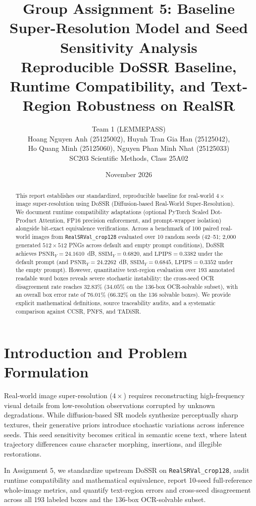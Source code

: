 \documentclass[11pt]{article}
\title{Group Assignment 5: Baseline Super-Resolution Model and Seed Sensitivity Analysis\\
\large Reproducible DoSSR Baseline, Runtime Compatibility, and Text-Region Robustness on RealSR}
\author{Team 1 (LEMMEPASS)\\
Hoang Nguyen Anh (25125002), Huynh Tran Gia Han (25125042),\\
Ho Quang Minh (25125060), Nguyen Phan Minh Nhat (25125033)\\
SC203 Scientific Methods, Class 25A02}
\date{November 2026}
\begin{document}
\maketitle

\begin{abstract}
This report establishes our standardized, reproducible baseline for real-world $4\times$ image super-resolution using DoSSR (Diffusion-based Real-World Super-Resolution). We document runtime compatibility adaptations (optional PyTorch Scaled Dot-Product Attention, FP16 precision enforcement, and prompt-wrapper isolation) alongside bit-exact equivalence verifications. Across a benchmark of 100 paired real-world images from \texttt{RealSRVal\_crop128} evaluated over 10 random seeds (42--51; 2,000 generated $512\times 512$ PNGs across default and empty prompt conditions), DoSSR achieves $\text{PSNR}_Y = 24.1610$~dB, $\text{SSIM}_Y = 0.6820$, and $\text{LPIPS} = 0.3382$ under the default prompt (and $\text{PSNR}_Y = 24.2262$~dB, $\text{SSIM}_Y = 0.6845$, $\text{LPIPS} = 0.3352$ under the empty prompt). However, quantitative text-region evaluation over 193 annotated readable word boxes reveals severe stochastic instability: the cross-seed OCR disagreement rate reaches $32.83\%$ ($34.05\%$ on the 136-box OCR-solvable subset), with an overall box error rate of $76.01\%$ ($66.32\%$ on the 136 solvable boxes). We provide explicit mathematical definitions, source traceability audits, and a systematic comparison against CCSR, PNFS, and TADiSR.
\end{abstract}

\section{Introduction and Problem Formulation}
Real-world image super-resolution ($4\times$) requires reconstructing high-frequency visual details from low-resolution observations corrupted by unknown degradations. While diffusion-based SR models synthesize perceptually sharp textures, their generative priors introduce stochastic variations across inference seeds. This seed sensitivity becomes critical in semantic scene text, where latent trajectory differences cause character morphing, insertions, and illegible restorations.

In Assignment 5, we standardize upstream DoSSR on \texttt{RealSRVal\_crop128}, audit runtime compatibility and mathematical equivalence, report 10-seed full-reference whole-image metrics, and quantify text-region errors and cross-seed disagreement across all 193 labeled boxes and the 136-box OCR-solvable subset.
\end{document}
